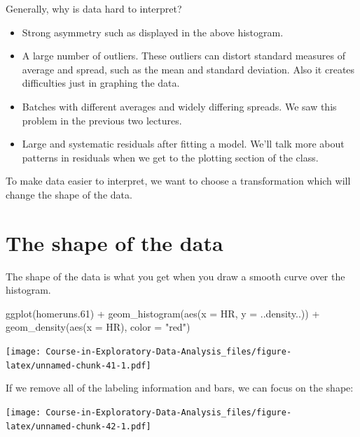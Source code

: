 \documentclass[
]{book}
\newenvironment{Shaded}{\begin{snugshade}}{\end{snugshade}}
\newcommand{\AttributeTok}[1]{\textcolor[rgb]{0.77,0.63,0.00}{#1}}
\newcommand{\FloatTok}[1]{\textcolor[rgb]{0.00,0.00,0.81}{#1}}
\newcommand{\FunctionTok}[1]{\textcolor[rgb]{0.00,0.00,0.00}{#1}}
\newcommand{\NormalTok}[1]{#1}
\newcommand{\SpecialCharTok}[1]{\textcolor[rgb]{0.00,0.00,0.00}{#1}}
\newcommand{\StringTok}[1]{\textcolor[rgb]{0.31,0.60,0.02}{#1}}
\begin{document}
Generally, why is data hard to interpret?

\begin{itemize}
\item
  Strong asymmetry such as displayed in the above histogram.
\item
  A large number of outliers. These outliers can distort standard measures of average and spread, such as the mean and standard deviation. Also it creates difficulties just in graphing the data.
\item
  Batches with different averages and widely differing spreads. We saw this problem in the previous two lectures.
\item
  Large and systematic residuals after fitting a model. We'll talk more about patterns in residuals when we get to the plotting section of the class.
\end{itemize}

To make data easier to interpret, we want to choose a transformation which will change the shape of the data.

\hypertarget{the-shape-of-the-data}{%
\section{The shape of the data}\label{the-shape-of-the-data}}

The shape of the data is what you get when you draw a smooth curve over the histogram.

\begin{Shaded}
\begin{Highlighting}[]
\FunctionTok{ggplot}\NormalTok{(homeruns}\FloatTok{.61}\NormalTok{) }\SpecialCharTok{+}
       \FunctionTok{geom\_histogram}\NormalTok{(}\FunctionTok{aes}\NormalTok{(}\AttributeTok{x =}\NormalTok{ HR, }\AttributeTok{y =}\NormalTok{ ..density..)) }\SpecialCharTok{+}
       \FunctionTok{geom\_density}\NormalTok{(}\FunctionTok{aes}\NormalTok{(}\AttributeTok{x =}\NormalTok{ HR), }
              \AttributeTok{color =} \StringTok{"red"}\NormalTok{)}
\end{Highlighting}
\end{Shaded}

\texttt{[image: Course-in-Exploratory-Data-Analysis\_files/figure-latex/unnamed-chunk-41-1.pdf]}

If we remove all of the labeling information and bars, we can focus on the shape:

\texttt{[image: Course-in-Exploratory-Data-Analysis\_files/figure-latex/unnamed-chunk-42-1.pdf]}
\end{document}
